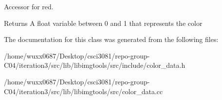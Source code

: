 Accessor for red. 

\begin{DoxyReturn}{Returns}
A float variable between 0 and 1 that represents the color 
\end{DoxyReturn}


The documentation for this class was generated from the following files\+:\begin{DoxyCompactItemize}
\item 
/home/wuxx0687/\+Desktop/csci3081/repo-\/group-\/\+C04/iteration3/src/lib/libimgtools/src/include/color\+\_\+data.\+h\item 
/home/wuxx0687/\+Desktop/csci3081/repo-\/group-\/\+C04/iteration3/src/lib/libimgtools/src/color\+\_\+data.\+cc\end{DoxyCompactItemize}
